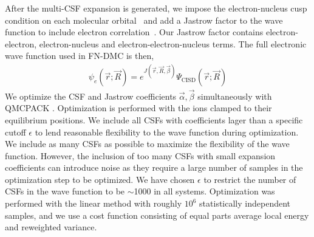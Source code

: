 \documentclass[pra,superscriptaddress,groupedaddress,twocolumn]{revtex4}
\begin{document}
After the multi-CSF expansion is generated, we impose the electron-nucleus cusp condition on each molecular orbital~\cite{cusp} and add a Jastrow factor to the wave function to include electron correlation~\cite{Kato}. Our Jastrow factor contains electron-electron, electron-nucleus and electron-electron-nucleus terms. The full electronic wave function used in FN-DMC is then,
\begin{align}
\psi_e(\vec{r};\vec{R})=e^{J(\vec{r},\vec{R},\vec{\beta})}\Psi_{\text{CISD}}(\vec{r};\vec{R})\label{eq:psie}
\end{align}
We optimize the CSF and Jastrow coefficients $\vec{\alpha},\vec{\beta}$ simultaneously with QMCPACK \cite{QMCPACK}. Optimization is performed with the ions clamped to their equilibrium positions. We include all CSFs with coefficients lager than a specific cutoff $\epsilon$ to lend reasonable flexibility to the wave function during optimization. We include as many CSFs as possible to maximize the flexibility of the wave function. However, the inclusion of too many CSFs with small expansion coefficients can introduce noise as they require a large number of samples in the optimization step to be optimized. We have chosen $\epsilon$ to restrict the number of CSFs in the wave function to be $\sim$1000 in all systems. Optimization was performed with the linear method with roughly $10^6$ statistically independent samples, and we use a cost function consisting of equal parts average local energy and reweighted variance.
\end{document}
